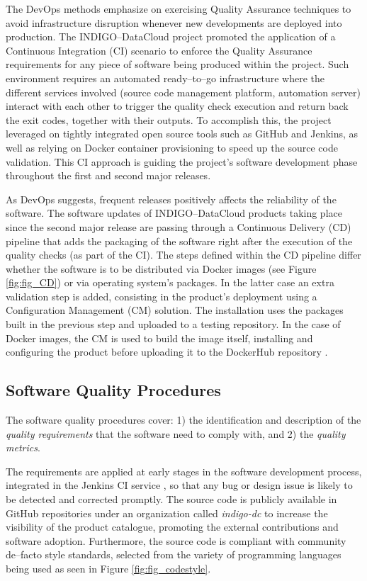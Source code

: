 \documentclass[journal]{IEEEtran}
\begin{document}
The DevOps methods emphasize on exercising Quality Assurance techniques to
avoid infrastructure disruption whenever new developments are deployed into
production. The INDIGO--DataCloud project promoted the application of a Continuous Integration (CI)
scenario to enforce the Quality Assurance requirements for any piece of
software being produced within the project. Such environment requires an
automated ready--to--go infrastructure where the different services involved
(source code management platform, automation server) interact with each other
to trigger the quality check execution and return back the exit codes, together
with their outputs. To accomplish this, the project leveraged on tightly
integrated open source tools such as GitHub and Jenkins, as well as relying on
Docker container provisioning to speed up the source code validation. This CI
approach is guiding the project’s software development phase throughout the
first and second major releases.

As DevOps suggests, frequent releases positively affects the reliability of the
software. The software updates of INDIGO--DataCloud products taking place since
the second major release are passing through a Continuous Delivery (CD)
pipeline that adds the packaging of the software right after the execution of
the quality checks (as part of the CI). 
The steps defined within the CD
pipeline differ whether the software is to be distributed via Docker
images (see Figure \ref{fig:fig_CD}) or via operating system’s packages. In the latter case an extra
validation step is added, consisting in the product’s deployment using a
Configuration Management (CM) solution. The installation uses the packages
built in the previous step and uploaded to a testing
repository. In the case of Docker images, the CM is used to build the image
itself, installing and configuring the product before uploading it to the
DockerHub repository \cite{indigo-dockerhub}. 


\subsection{Software Quality Procedures}

The software quality procedures \cite{indigo-d31} cover: 1) the identification
and description of the \emph{quality requirements} that the software need to
comply with, and 2) the \emph{quality metrics}.

The requirements are applied at early stages in the software development
process, integrated in the Jenkins CI service \cite{indigo-jenkins}, so that any
bug or design issue is likely to be detected and corrected promptly. The source
code is publicly available in GitHub repositories under an organization called
{\sl indigo-dc} \cite{indigo-github} to increase the visibility of the product
catalogue, promoting the external contributions and software adoption. Furthermore,
the source code is compliant with community de--facto style standards,
selected from the variety of programming languages being used as seen in
Figure \ref{fig:fig_codestyle}.
\end{document}

